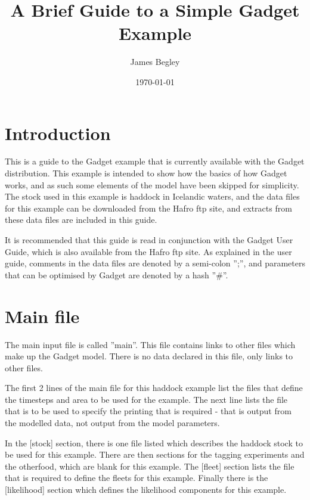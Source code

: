 \documentclass[10pt,titlepage]{article}
\begin{document}
\title{\Huge{A Brief Guide to a Simple Gadget Example}}
\author{James Begley}
\date{\today}
\maketitle

\section{Introduction}

This is a guide to the Gadget example that is currently available with the Gadget distribution.  This example is intended to show how the basics of how Gadget works, and as such some elements of the model have been skipped for simplicity.  The stock used in this example is haddock in Icelandic waters, and the data files for this example can be downloaded from the Hafro ftp site, and extracts from these data files are included in this guide.

\bigskip
It is recommended that this guide is read in conjunction with the Gadget User Guide, which is also available from the Hafro ftp site.  As explained in the user guide, comments in the data files are denoted by a semi-colon '';'', and parameters that can be optimised by Gadget are denoted by a hash ''\#''.

\section{Main file}

The main input file is called ''main''.  This file contains links to other files which make up the Gadget model.  There is no data declared in this file, only links to other files.

{\small }

The first 2 lines of the main file for this haddock example list the files that define the timesteps and area to be used for the example.  The next line lists the file that is to be used to specify the printing that is required - that is output from the modelled data, not output from the model parameters.

\bigskip
In the [stock] section, there is one file listed which describes the haddock stock to be used for this example.  There are then sections for the tagging experiments and the otherfood, which are blank for this example.  The [fleet] section lists the file that is required to define the fleets for this example.  Finally there is the [likelihood] section which defines the likelihood components for this example.
\end{document}
